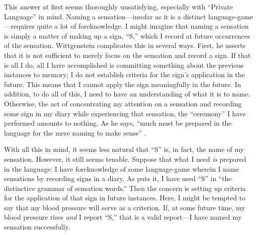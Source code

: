 \documentclass[doc,12pt,apacite,biblatex]{apa6}
\begin{document}
This answer at first seems thoroughly unsatisfying, especially with ``Private
Language'' in mind. Naming a sensation---insofar as it is a distinct
language-game---requires quite a lot of foreknowledge.  I might imagine that
naming a sensation is simply a matter of making up a sign, ``S,'' which I
record at future occurrences of the sensation. Wittgenstein complicates this in
several ways. First, he asserts that it is not sufficient to merely focus on
the sensation and record a sign. If that is all I do, all I have accomplished
is committing something about the previous instances to memory;
I do not establish criteria for the sign's application in the future. This
means that I cannot apply the sign meaningfully in the future.
In addition, to do all of this, I need to have an understanding of what it is
to name. Otherwise, the act of concentrating my attention on a sensation and
recording some sign in my diary while experiencing that sensation, the
``ceremony'' I have performed amounts to nothing. As he says, ``much must be
prepared in the language for the mere naming to make sense'' \cite[\S
257]{Wittgenstein53}.

With all this in mind, it seems less natural that ``S'' is, in fact, the name
of my sensation. However, it still seems tenable. Suppose that what I need
\emph{is} prepared in the language: I have foreknowledge
of some language-game wherein I name sensations by recording signs in a diary.
As  puts it, I have used ``S'' in ``the distinctive grammar of
sensation words.'' Then the concern is setting up criteria for the application
of that sign in future instances.
%
Here, I might be tempted to say that my blood pressure
will serve as a criterion. If, at some future time, my blood pressure rises
\emph{and} I report ``S,'' that is a valid report---I have named my sensation
successfully.
\end{document}
